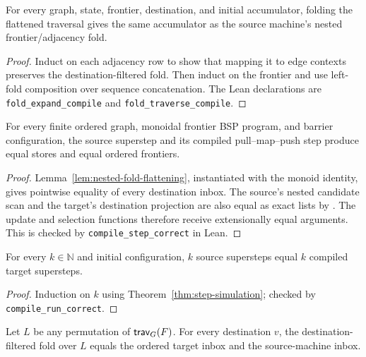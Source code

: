 \begin{lemma}\label{lem:nested-fold-flattening}
For every graph, state, frontier, destination, and initial accumulator,
folding the flattened traversal gives the same accumulator as the source
machine's nested frontier/adjacency fold.
\end{lemma}

\begin{proof}
Induct on each adjacency row to show that mapping it to edge contexts preserves
the destination-filtered fold.  Then induct on the frontier and use left-fold
composition over sequence concatenation.  The Lean declarations are
\texttt{fold\_expand\_compile} and \texttt{fold\_traverse\_compile}.
\end{proof}

\begin{theorem}\label{thm:step-simulation}
For every finite ordered graph, monoidal frontier BSP program, and barrier
configuration, the source superstep and its compiled pull--map--push step
produce equal stores and equal ordered frontiers.
\end{theorem}

\begin{proof}
Lemma~\ref{lem:nested-fold-flattening}, instantiated with the monoid identity,
gives pointwise equality of every destination inbox.  The source's nested
candidate scan and the target's destination projection are also equal as exact
lists by .  The update and
selection functions therefore receive extensionally equal arguments.  This is
checked by \texttt{compile\_step\_correct} in Lean.
\end{proof}

\begin{corollary}
\label{cor:run-simulation}
For every $k\in\mathbb{N}$ and initial configuration, $k$ source supersteps
equal $k$ compiled target supersteps.
\end{corollary}

\begin{proof}
Induction on $k$ using Theorem~\ref{thm:step-simulation}; checked by
\texttt{compile\_run\_correct}.
\end{proof}

\begin{theorem}
\label{thm:schedule-independence}
Let $L$ be any permutation of $\mathsf{trav}_G(F)$.  For every destination $v$, the
destination-filtered fold over $L$ equals the ordered target inbox and the
source-machine inbox.
\end{theorem}

